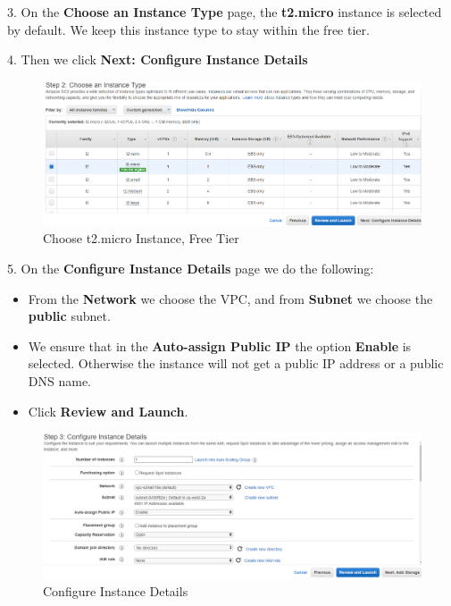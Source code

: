 \documentclass[12pt,a4paper,twoside]{article}
\begin{document}
3. On the \textbf{Choose an Instance Type} page, the \textbf{t2.micro} instance is selected by default. We keep this instance type to stay within the free tier.


4. Then we click \textbf{Next: Configure Instance Details}


\begin{figure}[H]
    \centering
        \includegraphics[width=15cm]{images-aws/6-instance-type.png}
        \caption{Choose t2.micro Instance, Free Tier}
\end{figure}


5. On the \textbf{Configure Instance Details} page we do the following:


\begin{itemize}
	\item From the \textbf{Network} we choose the VPC, and from \textbf{Subnet} we choose the \textbf{public} subnet.
	\item We ensure that in the \textbf{Auto-assign Public IP} the option \textbf{Enable} is selected. Otherwise the instance will not
get a public IP address or a public DNS name.
	\item Click \textbf{Review and Launch}.
\end{itemize}


\begin{figure}[H]
    \centering
        \includegraphics[width=15cm]{images-aws/7-config-instance-details.png}
        \caption{Configure Instance Details}
\end{figure}
\end{document}
